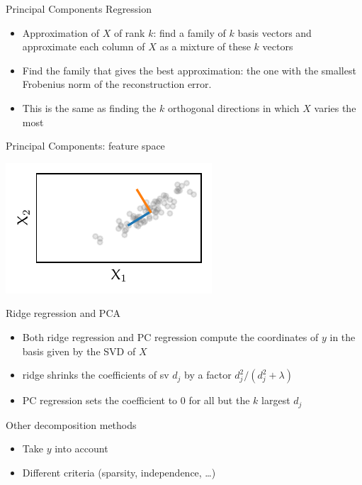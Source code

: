 \documentclass[presentation,mathserif,table]{beamer}
\begin{document}
\begin{frame}[label={sec:org8522074}]{Principal Components Regression}
\begin{itemize}
\item Approximation of \(X\) of rank \(k\): find a family of \(k\) basis vectors and approximate each column of \(X\) as a mixture of these \(k\) vectors
\item Find the family that gives the best approximation: the one with the smallest Frobenius norm of the reconstruction error.
\item This is the same as finding the \(k\) orthogonal directions in which \(X\) varies the most
\end{itemize}
\end{frame}

\begin{frame}[label={sec:orgbeb0771}]{Principal Components: feature space}
\begin{center}
\includegraphics[height=.3\textheight]{figures/generated/pca/cloud_not_aligned_with_pc.pdf}
\end{center}
\end{frame}

\begin{frame}[label={sec:org31fc2e9}]{Ridge regression and PCA}
\begin{itemize}
\item Both ridge regression and PC regression compute the coordinates of \(y\) in the basis given by the SVD of \(X\)
\item ridge shrinks the coefficients of sv \(d_j\) by a factor \(d_j^2 / (d_j^2 + \lambda)\)
\item PC regression sets the coefficient to 0 for all but the \(k\) largest \(d_j\)
\end{itemize}
\end{frame}
\begin{frame}[label={sec:org9abd636}]{Other decomposition methods}
\begin{itemize}
\item Take \(y\) into account
\item Different criteria (sparsity, independence, \ldots{})
\end{itemize}
\end{frame}
\end{document}
